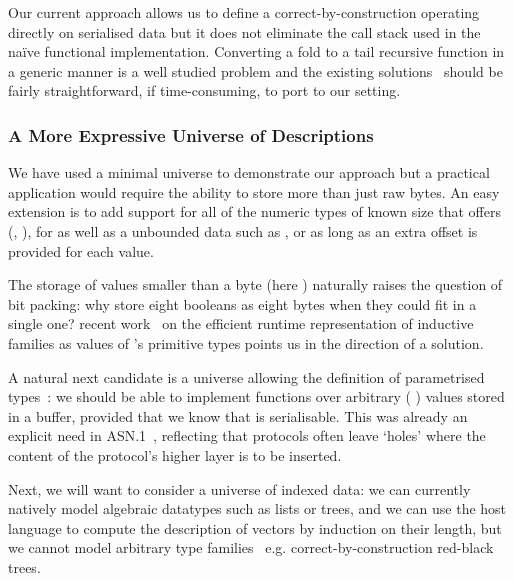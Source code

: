 Our current approach allows us to define a correct-by-construction
 operating directly on serialised data but it
does not eliminate the call stack used in the naïve functional
implementation.
%
Converting a fold to a tail recursive function in a generic manner
is a well studied problem and the existing
solutions~\citep{DBLP:conf/popl/McBride08,DBLP:conf/icfp/CortinasS18}
should be fairly straightforward, if time-consuming, to port to our setting.

\subsubsection{A More Expressive Universe of Descriptions}

We have used a minimal universe to demonstrate our approach but a practical
application would require the ability to store more than just raw bytes.
An easy extension is to add support for all of the numeric types of
known size that \idris{} offers
(, ),
for 
as well as a unbounded data such as , or 
as long as an extra offset is provided for each value.

The storage of values smaller than a byte (here ) naturally
raises the question of bit packing: why store eight booleans as eight bytes
when they could fit in a single one?
%
\iftoggle{BLIND}{Allais'}{Our} recent work~\citep{DBLP:conf/esop/Allais23}
on the efficient runtime representation of inductive families as values
of \idris{}'s primitive types points us in the direction of a solution.

A natural next candidate is a universe allowing the definition of parametrised
types~\citep{DBLP:conf/icfp/LohM11}: we should be able to implement functions over arbitrary
( ) values stored in a buffer,
provided that we know that  is serialisable.
%
This was already an explicit need in ASN.1~\citep{MANUAL:book/larmouth1999},
reflecting that protocols often leave `holes' where the content of
the protocol's higher layer is to be inserted.

Next, we will want to consider a universe of indexed data:
we can currently natively model algebraic datatypes such as lists or trees,
and we can use the host language to compute the description
of vectors by induction on their length,
but we cannot model arbitrary type families~\citep{DBLP:journals/fac/Dybjer94}
e.g. correct-by-construction red-black trees.

